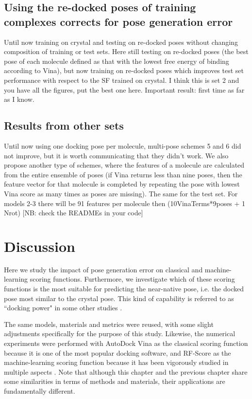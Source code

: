 \documentclass[twocolumn]{bmcart}
\begin{document}
\subsection*{Using the re-docked poses of training complexes corrects for pose generation error}

Until now training on crystal and testing on re-docked poses without changing composition of training or test sets. Here still testing on re-docked poses (the best pose of each molecule defined as that with the lowest free energy of binding according to Vina), but now training on re-docked poses which improves test set performance with respect to the SF trained on crystal. I think this is set 2 and you have all the figures, put the best one here. Important result: first time as far as I know.

\subsection*{Results from other sets}

Until now using one docking pose per molecule, multi-pose schemes 5 and 6 did not improve, but it is worth communicating that they didn’t work. We also propose another type of schemes, where the features of a molecule are calculated from the entire ensemble of poses (if Vina returns less than nine poses, then the feature vector for that molecule is completed by repeating the pose with lowest Vina score as many times as poses are missing). The same for the test set. For models 2-3 there will be 91 features per molecule then (10VinaTerms*9poses + 1 Nrot) [NB: check the READMEs in your code]

\section*{Discussion}

Here we study the impact of pose generation error on classical and machine-learning scoring functions. Furthermore, we investigate which of these scoring functions is the most suitable for predicting the near-native pose, i.e. the docked pose most similar to the crystal pose. This kind of capability is referred to as ``docking power" in some other studies \cite{1411}.

The same models, materials and metrics were reused, with some slight adjustments specifically for the purpose of this study. Likewise, the numerical experiments were performed with AutoDock Vina \cite{595} as the classical scoring function because it is one of the most popular docking software, and RF-Score \cite{564} as the machine-learning scoring function because it has been vigorously studied in multiple aspects \cite{1281,1362,1370}. Note that although this chapter and the previous chapter share some similarities in terms of methods and materials, their applications are fundamentally different.
\end{document}
